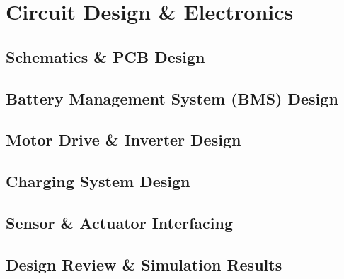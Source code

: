 \section{Circuit Design \& Electronics}

\subsection{Schematics \& PCB Design}

\subsection{Battery Management System (BMS) Design}

\subsection{Motor Drive \& Inverter Design}

\subsection{Charging System Design}

\subsection{Sensor \& Actuator Interfacing}

\subsection{Design Review \& Simulation Results}
